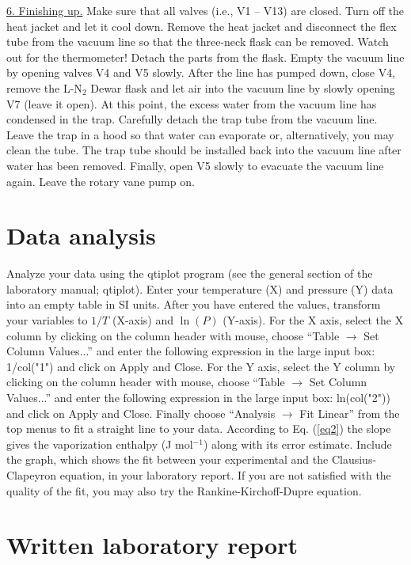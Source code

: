 \documentclass[byrevtex,amssymb,aps,pra,floatfix,letterpaper]{revtex4}
\begin{document}
\noindent
\underline{6. Finishing up.} Make sure that all valves (i.e., V1 -- V13) are closed. Turn off the heat jacket and let it cool down. Remove the heat jacket and disconnect the flex tube from the vacuum line so that the three-neck flask can be removed. Watch out for the thermometer! Detach the parts from the flask. Empty the vacuum line by opening valves V4 and V5 slowly. After the line has pumped down, close V4, remove the L-N$_2$ Dewar flask and let air into the vacuum line by slowly opening V7 (leave it open). At this point, the excess water from the vacuum line has condensed in the trap. Carefully detach the trap tube from the vacuum line. Leave the trap in a hood so that water can evaporate or, alternatively, you may clean the tube. The trap tube should be installed back into the vacuum line after water has been removed. Finally, open V5 slowly to evacuate the vacuum line again. Leave the rotary vane pump on.

\section{Data analysis}

Analyze your data using the qtiplot program (see the general section of the laboratory manual; qtiplot). Enter your temperature (X) and pressure (Y) data into an empty table in SI units. After you have entered the values, transform your variables to $1/T$ (X-axis) and $\ln(P)$ (Y-axis). For the X axis, select the X column by clicking on the column header with mouse, choose ``Table $\rightarrow$ Set Column Values...'' and enter the following expression in the large input box: 1/col("1") and click on Apply and Close. For the Y axis, select the Y column by clicking on the column header with mouse, choose ``Table $\rightarrow$ Set Column Values...'' and enter the following expression in the large input box: ln(col("2")) and click on Apply and Close. Finally choose ``Analysis $\rightarrow$ Fit Linear'' from the top menus to fit a straight line to your data. According to Eq. (\ref{eq2}) the slope gives the vaporization enthalpy (J mol$^{-1}$) along with its error estimate. Include the graph, which shows the fit between your experimental and the Clausius-Clapeyron equation, in your laboratory report. If you are not satisfied with the quality of the fit, you may also try the Rankine-Kirchoff-Dupre equation.

\section{Written laboratory report}
\end{document}
